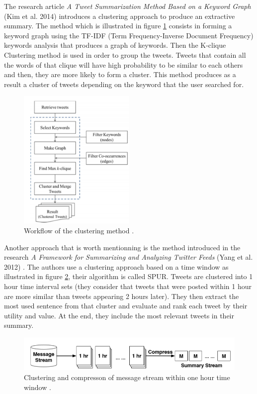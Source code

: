 \documentclass{llncs}
\begin{document}
The research article \textit{A Tweet Summarization Method Based on a Keyword
Graph} (Kim et al. 2014) \cite{kim_tweet_2014} introduces a clustering approach
to produce an extractive summary. The method which is illustrated in figure
\ref{fig:fig4} consists in forming a keyword graph using the TF-IDF (Term
Frequency-Inverse Document Frequency) keywords analysis that produces a graph
of keywords. Then the K-clique Clustering method is used in order to group the
tweets. Tweets that contain all the words of that clique will have high
probability to be similar to each others and then, they are more likely to form
a cluster. This method produces as a result a cluster of tweets depending on
the keyword that the user searched for.

\begin{figure}[H]
    \centering
    \includegraphics[width=0.5\textwidth]{fig4.png}
    \caption{Workflow of the clustering method \cite{kim_tweet_2014}.}
    \label{fig:fig4}
\end{figure}

Another approach that is worth mentionning is the method introduced in the
research \textit{A Framework for Summarizing and Analyzing Twitter Feeds} (Yang
et al. 2012) \cite{yang_framework_2012}.
The authors use a clustering approach based on a time window as illustrated in
figure \ref{fig:fig5}, their algorithm is called SPUR. Tweets are clustered into 1
hour time interval sets (they consider that tweets that were posted within 1
hour are more similar than tweets appearing 2 hours later).  They then extract
the most used sentence from that cluster and evaluate and rank each tweet by
their utility and value. At the end, they include the most relevant tweets in
their summary.

\begin{figure}[H]
    \includegraphics[width=\textwidth]{fig5.png}
    \caption{Clustering and compresson of message stream within one hour time
    window \cite{yang_framework_2012}.}
    \label{fig:fig5}
\end{figure}
\end{document}
